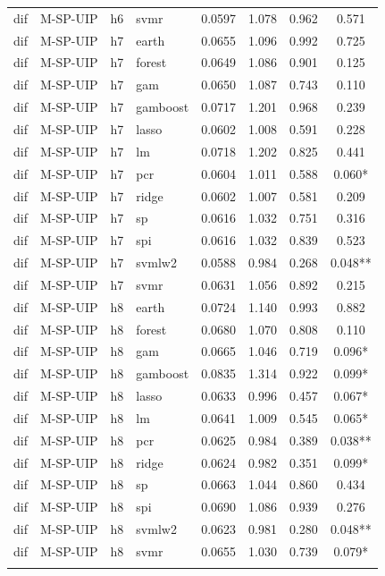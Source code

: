 \begin{ThreePartTable}
\begin{longtable}[t]{llclcccc}
dif & M-SP-UIP & h6 & svmr & 0.0597 & 1.078 & 0.962 & 0.571\\
\addlinespace
dif & M-SP-UIP & h7 & earth & 0.0655 & 1.096 & 0.992 & 0.725\\
dif & M-SP-UIP & h7 & forest & 0.0649 & 1.086 & 0.901 & 0.125\\
dif & M-SP-UIP & h7 & gam & 0.0650 & 1.087 & 0.743 & 0.110\\
dif & M-SP-UIP & h7 & gamboost & 0.0717 & 1.201 & 0.968 & 0.239\\
dif & M-SP-UIP & h7 & lasso & 0.0602 & 1.008 & 0.591 & 0.228\\
dif & M-SP-UIP & h7 & lm & 0.0718 & 1.202 & 0.825 & 0.441\\
dif & M-SP-UIP & h7 & pcr & 0.0604 & 1.011 & 0.588 & 0.060*\\
dif & M-SP-UIP & h7 & ridge & 0.0602 & 1.007 & 0.581 & 0.209\\
dif & M-SP-UIP & h7 & sp & 0.0616 & 1.032 & 0.751 & 0.316\\
dif & M-SP-UIP & h7 & spi & 0.0616 & 1.032 & 0.839 & 0.523\\
dif & M-SP-UIP & h7 & svmlw2 & 0.0588 & 0.984 & 0.268 & 0.048**\\
dif & M-SP-UIP & h7 & svmr & 0.0631 & 1.056 & 0.892 & 0.215\\
\addlinespace
dif & M-SP-UIP & h8 & earth & 0.0724 & 1.140 & 0.993 & 0.882\\
dif & M-SP-UIP & h8 & forest & 0.0680 & 1.070 & 0.808 & 0.110\\
dif & M-SP-UIP & h8 & gam & 0.0665 & 1.046 & 0.719 & 0.096*\\
dif & M-SP-UIP & h8 & gamboost & 0.0835 & 1.314 & 0.922 & 0.099*\\
dif & M-SP-UIP & h8 & lasso & 0.0633 & 0.996 & 0.457 & 0.067*\\
dif & M-SP-UIP & h8 & lm & 0.0641 & 1.009 & 0.545 & 0.065*\\
dif & M-SP-UIP & h8 & pcr & 0.0625 & 0.984 & 0.389 & 0.038**\\
dif & M-SP-UIP & h8 & ridge & 0.0624 & 0.982 & 0.351 & 0.099*\\
dif & M-SP-UIP & h8 & sp & 0.0663 & 1.044 & 0.860 & 0.434\\
dif & M-SP-UIP & h8 & spi & 0.0690 & 1.086 & 0.939 & 0.276\\
dif & M-SP-UIP & h8 & svmlw2 & 0.0623 & 0.981 & 0.280 & 0.048**\\
dif & M-SP-UIP & h8 & svmr & 0.0655 & 1.030 & 0.739 & 0.079*\\
\addlinespace

\end{longtable}
\end{ThreePartTable}
